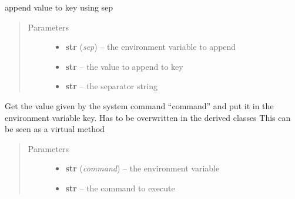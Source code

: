 \documentclass[a4paper,10pt,english]{sphinxmanual}
\begin{document}
\begin{fulllineitems}
\begin{fulllineitems}
\label{commands/apidoc/src:src.fileEnviron.FileEnviron.append_value}
append value to key using sep
\begin{quote}\begin{description}
\item[{Parameters}] \leavevmode\begin{itemize}
\item {} 
\textbf{str} (\emph{sep}) -- the environment variable to append

\item {} 
\textbf{str} -- the value to append to key

\item {} 
\textbf{str} -- the separator string

\end{itemize}

\end{description}\end{quote}

\end{fulllineitems}


\begin{fulllineitems}
\label{commands/apidoc/src:src.fileEnviron.FileEnviron.command_value}
Get the value given by the system command ``command'' 
and put it in the environment variable key.
Has to be overwritten in the derived classes
This can be seen as a virtual method
\begin{quote}\begin{description}
\item[{Parameters}] \leavevmode\begin{itemize}
\item {} 
\textbf{str} (\emph{command}) -- the environment variable

\item {} 
\textbf{str} -- the command to execute

\end{itemize}

\end{description}\end{quote}

\end{fulllineitems}


\end{fulllineitems}
\end{document}
